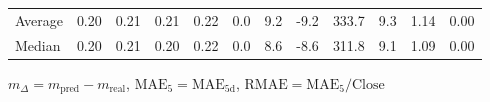 \begin{threeparttable}
{\begin{tabular}{lrrrrrrrrrrr}
Average &          0.20 &          0.21 &          0.21 &        0.22 &                 0.0 &                 9.2 &       -9.2 &               333.7 &              9.3 &            1.14 &                   0.00 \\
 Median &          0.20 &          0.21 &          0.20 &        0.22 &                 0.0 &                 8.6 &       -8.6 &               311.8 &              9.1 &            1.09 &                   0.00 \\
\bottomrule
\end{tabular}
}
\begin{tablenotes}\footnotesize
\item $m_\Delta=m_{\text{pred}}-m_{\text{real}}$,
$\mathrm{MAE}_5=\mathrm{MAE}_{5\text{d}}$,
$\mathrm{RMAE}=\mathrm{MAE}_5/\text{Close}$
\end{tablenotes}
\end{threeparttable}
\endgroup

